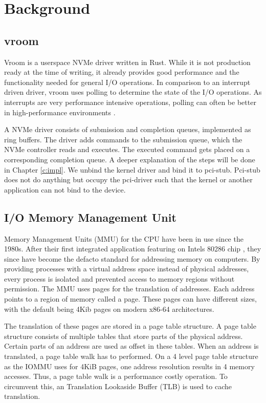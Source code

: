 \chapter{Background}

\section{vroom}
Vroom is a userspace NVMe driver written in Rust. While it is not production ready at the time of writing, it already provides good performance and the functionality needed for general I/O operations. In comparison to an interrupt driven driver, vroom uses polling to determine the state of the I/O operations. As interrupts are very performance intensive operations, polling can often be better in high-performance environments \cite{spdksubmitting}.

A NVMe driver consists of submission and completion queues, implemented as ring buffers. The driver adds commands to the submission queue, which the NVMe controller reads and executes. The executed command gets placed on a corresponding completion queue. A deeper explanation of the steps will be done in Chapter \autoref{c:impl}.
We unbind the kernel driver and bind it to pci-stub. Pci-stub does not do anything but occupy the pci-driver such that the kernel or another application can not bind to the device.

\section{I/O Memory Management Unit}
Memory Management Units (MMU) for the CPU have been in use since the 1980s. After their first integrated application featuring on Intels 80286 chip \cite{intel80286}, they since have become the defacto standard for addressing memory on computers. By providing processes with a virtual address space instead of physical addresses, every process is isolated and prevented access to memory regions without permission. The MMU uses pages for the translation of addresses. Each address points to a region of memory called a page. These pages can have different sizes, with the default being 4Kib pages on modern x86-64 architectures.

The translation of these pages are stored in a page table structure. A page table structure consists of multiple tables that store parts of the physical address. Certain parts of an address are used as offset in these tables. When an address is translated, a page table walk has to performed. On a 4 level page table structure as the IOMMU uses for 4KiB pages, one address resolution results in 4 memory accesses. Thus, a page table walk is a performance costly operation. To circumvent this, an Translation Lookaside Buffer (TLB) is used to cache translation.

